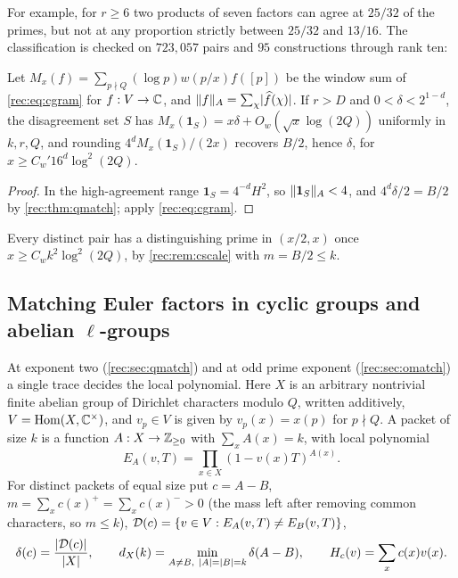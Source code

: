 For example, for $r\ge6$ two products of seven factors can agree at $25/32$ of the primes, but not at
any proportion strictly between $25/32$ and $13/16$. The classification is checked on $723{,}057$ pairs
and $95$ constructions through rank ten:
\begin{center}
\end{center}

\begin{theorem}\label{rec:thm:qmatchfinite}
Let $M_x(f)=\sum_{p\nmid Q}(\log p)w(p/x)f([p])$ be the window sum of \eqref{rec:eq:cgram} for $f:V\to\mathbb{C}$, and $\lVert f\rVert_A=\sum_\chi\lvert\widehat f(\chi)\rvert$. If $r>D$ and
$0<\delta<2^{1-d}$, the disagreement set $S$ has $M_x(\mathbf 1_S)=x\delta+O_w(\sqrt x\log(2Q))$ uniformly in $k,r,Q$, and
rounding $4^dM_x(\mathbf 1_S)/(2x)$ recovers $B/2$, hence $\delta$, for $x\ge C_w'16^d\log^2(2Q)$.
\end{theorem}

\begin{proof}
In the high-agreement range $\mathbf 1_S=4^{-d}H^2$, so $\lVert\mathbf 1_S\rVert_A<4$, and $4^d\delta/2=B/2$ by \cref{rec:thm:qmatch};
apply \eqref{rec:eq:cgram}.
\end{proof}

Every distinct pair has a distinguishing prime in $(x/2,x)$ once $x\ge C_wk^2\log^2(2Q)$, by \cref{rec:rem:cscale}
with $m=B/2\le k$.

\subsection{Matching Euler factors in cyclic groups and abelian $\ell$-groups}\label{rec:sec:cmatch}

At exponent two (\cref{rec:sec:qmatch}) and at odd prime exponent (\cref{rec:sec:omatch}) a single trace decides
the local polynomial. Here $X$ is an arbitrary nontrivial finite abelian group of Dirichlet characters
modulo $Q$, written additively, $V=\operatorname{Hom}(X,\mathbb{C}^\times)$, and $v_p\in V$ is given by $v_p(x)=x(p)$ for $p\nmid Q$. A
packet of size $k$ is a function $A:X\to\mathbb{Z}_{\ge0}$ with $\sum_xA(x)=k$, with local polynomial
\[
 E_A(v,T)=\prod_{x\in X}(1-v(x)T)^{A(x)}.
\]
For distinct packets of equal size put $c=A-B$, $m=\sum_xc(x)^+=\sum_xc(x)^->0$ (the mass left after
removing common characters, so $m\le k$), $\mathcal D(c)=\{v\in V:E_A(v,T)\ne E_B(v,T)\}$,
\[
 \delta(c)=\frac{\lvert\mathcal D(c)\rvert}{\lvert X\rvert},\qquad d_X(k)=\min_{A\ne B,\ \lvert A\rvert=\lvert B\rvert=k}\delta(A-B),\qquad H_c(v)=\sum_xc(x)v(x).
\]

